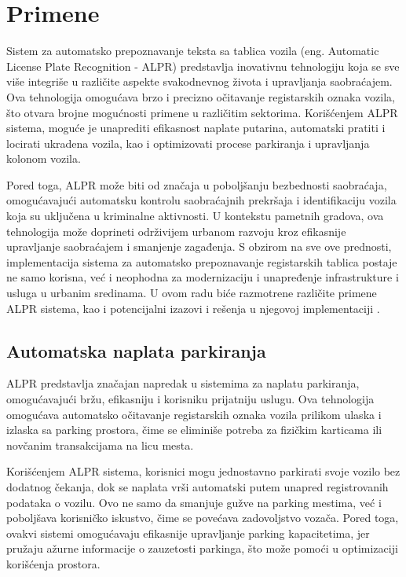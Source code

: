 \documentclass[a4paper,12pt]{article}
\begin{document}
	\section{Primene}
	Sistem za automatsko prepoznavanje teksta sa tablica vozila (eng. Automatic License Plate Recognition - ALPR) predstavlja inovativnu tehnologiju koja se sve više integriše u različite aspekte svakodnevnog života i upravljanja saobraćajem. Ova tehnologija omogućava brzo i precizno očitavanje registarskih oznaka vozila, što otvara brojne mogućnosti primene u različitim sektorima. Korišćenjem ALPR sistema, moguće je unaprediti efikasnost naplate putarina, automatski pratiti i locirati ukradena vozila, kao i optimizovati procese parkiranja i upravljanja kolonom vozila.
	
	Pored toga, ALPR može biti od značaja u poboljšanju bezbednosti saobraćaja, omogućavajući automatsku kontrolu saobraćajnih prekršaja i identifikaciju vozila koja su uključena u kriminalne aktivnosti. U kontekstu pametnih gradova, ova tehnologija može doprineti održivijem urbanom razvoju kroz efikasnije upravljanje saobraćajem i smanjenje zagađenja. S obzirom na sve ove prednosti, implementacija sistema za automatsko prepoznavanje registarskih tablica postaje ne samo korisna, već i neophodna za modernizaciju i unapređenje infrastrukture i usluga u urbanim sredinama. U ovom radu biće razmotrene različite primene ALPR sistema, kao i potencijalni izazovi i rešenja u njegovoj implementaciji \cite{perplexityUpitZaPrimene}.
	
	\subsection{Automatska naplata parkiranja}
	ALPR predstavlja značajan napredak u sistemima za naplatu parkiranja, omogućavajući bržu, efikasniju i korisniku prijatniju uslugu. Ova tehnologija omogućava automatsko očitavanje registarskih oznaka vozila prilikom ulaska i izlaska sa parking prostora, čime se eliminiše potreba za fizičkim karticama ili novčanim transakcijama na licu mesta.
	
	Korišćenjem ALPR sistema, korisnici mogu jednostavno parkirati svoje vozilo bez dodatnog čekanja, dok se naplata vrši automatski putem unapred registrovanih podataka o vozilu. Ovo ne samo da smanjuje gužve na parking mestima, već i poboljšava korisničko iskustvo, čime se povećava zadovoljstvo vozača. Pored toga, ovakvi sistemi omogućavaju efikasnije upravljanje parking kapacitetima, jer pružaju ažurne informacije o zauzetosti parkinga, što može pomoći u optimizaciji korišćenja prostora.
	
\end{document}
